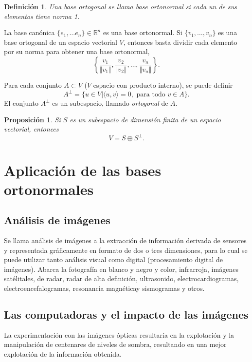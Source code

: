 \documentclass[b5paper, 11pt]{book}
\newcommand{\0}{\mathbf{0}}
\newcommand{\R}{\mathds{R}}
\theoremstyle{estiloB}
\theoremstyle{estiloC}
\newtheorem{unadefi}{Definición}[chapter]
\theoremstyle{estiloD}
\newtheorem{propo}{Proposición}[chapter]
\begin{document}
\begin{unadefi}
Una base ortogonal se llama \textit{base ortonormal} si cada un de sus elementos tiene norma 1. 
\end{unadefi}

La base can\'onica $\{ e_{1}, \ldots e_{n} \} \in \R^{n}$ es una base ortonormal. Si $\{ v_{1}, \ldots , v_{n} \}$ es una base ortogonal de un espacio vectorial $V$, entonces basta dividir cada elemento por su norma para obtener una base ortonormal,
\[
\left\{ \dfrac{v_{1}}{\Vert v_{1} \Vert}, \dfrac{v_{2}}{\Vert v_{2} \Vert}, \ldots , \dfrac{v_{n}}{\Vert v_{n} \Vert} \right\}.
\]

Para cada conjunto $A \subset V$ ($V$ espacio con producto interno), se puede definir
\[
A^{\perp}= \{ u \in  V | \langle u,v \rangle =0, \text{ para todo } v \in A \}.
\]
El conjunto $A^{\perp}$ es un subespacio, llamado \textit{ortogonal} de $A$.

\begin{propo}
Si $S$ es un subespacio de dimensi\'on finita de un espacio vectorial, entonces
\[
V= S \oplus S^{\perp}.
\]
\end{propo}

\section{Aplicaci\'on de las bases ortonormales}

\subsection{An\'alisis de im\'agenes}
Se llama an\'alisis de im\'agenes a la extracci\'on de informaci\'on derivada de sensores y representada gr\'aficamente en formato de dos o tres dimensiones, para lo cual se puede utilizar tanto an\'alisis visual como digital (procesamiento digital de im\'agenes). Abarca la fotograf\'ia en blanco y negro y color, infrarroja, im\'agenes sat\'elitales, de radar, radar de alta definici\'on, ultrasonido, electrocardiogramas, electroencefalogramas, resonancia magn\'eticay sismogramas y otros.

\subsection{Las computadoras y el impacto de las im\'agenes}
La experimentaci\'on con las im\'agenes \'opticas resultar\'ia en la explotaci\'on y la manipulaci\'on de centenares de niveles de sombra, resultando en una mejor explotaci\'on de la informaci\'on obtenida.
\end{document}
